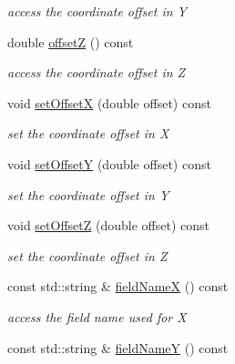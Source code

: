 \begin{DoxyCompactItemize}
\begin{DoxyCompactList}\small\item\em access the coordinate offset in Y \item\end{DoxyCompactList}\item 
double \hyperlink{class_d_d4hep_1_1_geometry_1_1_cartesian_grid_x_y_z_a239afa94d589bc37e84898375dc90638}{offsetZ} () const 
\begin{DoxyCompactList}\small\item\em access the coordinate offset in Z \item\end{DoxyCompactList}\item 
void \hyperlink{class_d_d4hep_1_1_geometry_1_1_cartesian_grid_x_y_z_af10c7bf912862181974249146bf94cd3}{setOffsetX} (double offset) const 
\begin{DoxyCompactList}\small\item\em set the coordinate offset in X \item\end{DoxyCompactList}\item 
void \hyperlink{class_d_d4hep_1_1_geometry_1_1_cartesian_grid_x_y_z_a0ba948d53028de0fbf10e1be5c15f556}{setOffsetY} (double offset) const 
\begin{DoxyCompactList}\small\item\em set the coordinate offset in Y \item\end{DoxyCompactList}\item 
void \hyperlink{class_d_d4hep_1_1_geometry_1_1_cartesian_grid_x_y_z_ad7ac27ba83433c33b4b9831070d5961f}{setOffsetZ} (double offset) const 
\begin{DoxyCompactList}\small\item\em set the coordinate offset in Z \item\end{DoxyCompactList}\item 
const std::string \& \hyperlink{class_d_d4hep_1_1_geometry_1_1_cartesian_grid_x_y_z_a95577a5b7e43b9293d92c6eae167c921}{fieldNameX} () const 
\begin{DoxyCompactList}\small\item\em access the field name used for X \item\end{DoxyCompactList}\item 
const std::string \& \hyperlink{class_d_d4hep_1_1_geometry_1_1_cartesian_grid_x_y_z_a4adc175349203a45fd567d56427633dd}{fieldNameY} () const 

\end{DoxyCompactItemize}

